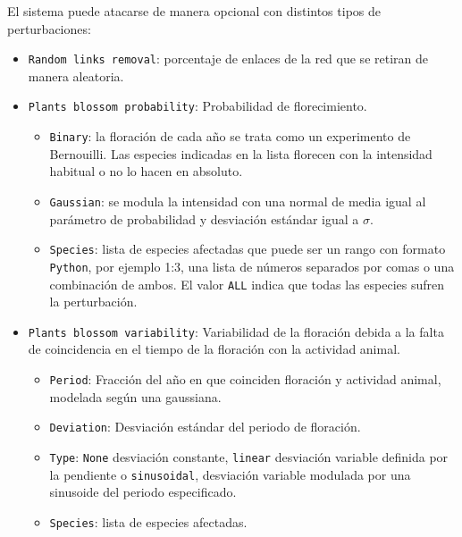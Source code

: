 El sistema puede atacarse de manera opcional con distintos tipos de perturbaciones:
\begin{itemize}
\item \texttt{Random links removal}: porcentaje de enlaces de la red que se retiran de manera aleatoria.

\item \texttt{Plants blossom probability}: Probabilidad de florecimiento. 

\begin{itemize}
	\item \texttt{Binary}: la floración de cada año se trata como un experimento de Bernouilli. Las especies indicadas en la lista florecen con la intensidad habitual o no lo hacen en absoluto.

    \item \texttt{Gaussian}: se modula la intensidad con una normal de media igual al parámetro de probabilidad y desviación estándar igual a $\sigma$.
    
    \item \texttt{Species}: lista de especies afectadas que puede ser un rango con formato \texttt{Python}, por ejemplo 1:3, una lista de números separados por comas o una combinación de ambos. El valor \texttt{ALL} indica que todas las especies sufren la perturbación.
\end{itemize}

\item \texttt{Plants blossom variability}: Variabilidad de la floración debida a la falta de coincidencia en el tiempo de la floración con la actividad animal.
\begin{itemize}
	\item \texttt{Period}: Fracción del año en que coinciden floración y actividad animal, modelada según una gaussiana.

    \item \texttt{Deviation}: Desviación estándar del periodo de floración.
    
    \item \texttt{Type}:  \texttt{None} desviación constante, \texttt{linear} desviación variable definida por la pendiente o \texttt{sinusoidal}, desviación variable modulada por una sinusoide del periodo especificado.
    
    \item \texttt{Species}: lista de especies afectadas.
\end{itemize}

\end{itemize}

